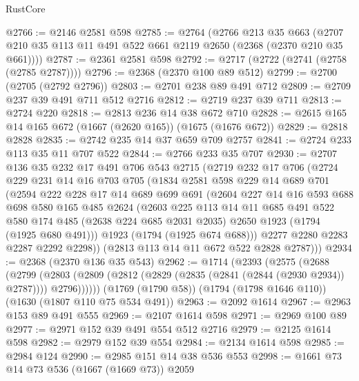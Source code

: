 \begin{lexlean}{RustCore}
\begin{coremodule}
@2766 := @2146 @2581 @598
@2785 := @2764
    (@2766
      @213
      @35
      @663
      (@2707 @210 @35 @113 @11 @491 @522 @661 @2119 @2650 (@2368 (@2370 @210 @35 @661))))
@2787 := @2361 @2581 @598
@2792 := @2717 (@2722 (@2741 (@2758 (@2785 @2787))))
@2796 := @2368 (@2370 @100 @89 @512)
@2799 := @2700 (@2705 (@2792 @2796))
@2803 := @2701 @238 @89 @491 @712
@2809 := @2709 @237 @39 @491 @711 @512 @2716
@2812 := @2719 @237 @39 @711
@2813 := @2724 @220
@2818 := @2813 @236 @14 @38 @672 @710
@2828 := @2615 @165 @14 @165 @672 (@1667 (@2620 @165)) (@1675 (@1676 @672))
@2829 := @2818 @2828
@2835 := @2742 @235 @14 @37 @659 @709 @2757
@2841 := @2724 @233 @113 @35 @11 @707 @522
@2844 := @2766 @233 @35 @707
@2930 := @2707
    @136
    @35
    @232
    @17
    @491
    @706
    @543
    @2715
    (@2719
      @232
      @17
      @706
      (@2724
        @229
        @231
        @14
        @16
        @703
        @705
        (@1834
          @2581
          @598
          @229
          @14
          @689
          @701
          (@2594
            @222
            @228
            @17
            @14
            @689
            @699
            @691
            (@2604
              @227
              @14
              @16
              @593
              @688
              @698
              @580
              @165
              @485
              @2624
              (@2603
                @225
                @113
                @14
                @11
                @685
                @491
                @522
                @580
                @174
                @485
                (@2638 @224 @685 @2031 @2035)
                @2650
                @1923
                (@1794 (@1925 @680 @491)))
              @1923
              (@1794 (@1925 @674 @688)))
            @2277
            @2280
            @2283
            @2287
            @2292
            @2298))
        (@2813 @113 @14 @11 @672 @522 @2828 @2787)))
@2934 := @2368 (@2370 @136 @35 @543)
@2962 := @1714
    (@2393
      (@2575
        (@2688
          (@2799
            (@2803 (@2809 (@2812 (@2829 (@2835 (@2841 (@2844 (@2930 @2934)) @2787)))) @2796))))))
    (@1769 (@1790 @58))
    (@1794 (@1798 @1646 @110))
    (@1630 (@1807 @110 @75 @534 @491))
@2963 := @2092 @1614
@2967 := @2963 @153 @89 @491 @555
@2969 := @2107 @1614 @598
@2971 := @2969 @100 @89
@2977 := @2971 @152 @39 @491 @554 @512 @2716
@2979 := @2125 @1614 @598
@2982 := @2979 @152 @39 @554
@2984 := @2134 @1614 @598
@2985 := @2984 @124
@2990 := @2985 @151 @14 @38 @536 @553
@2998 := @1661 @73 @14 @73 @536 (@1667 (@1669 @73)) @2059

\end{coremodule}
\end{lexlean}
